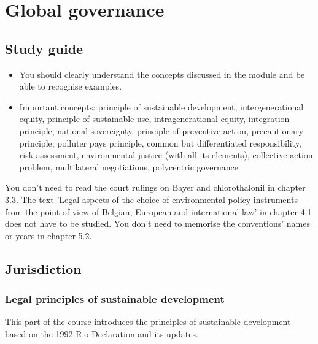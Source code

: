 \documentclass[../summary.tex]{subfiles}
\begin{document}
\section{Global governance}

\subsection{Study guide}
\label{sec:13-study-guide}

\begin{itemize}
	\item You should clearly understand the concepts discussed in the module and be able to recognise examples.
	\item Important concepts: principle of sustainable development, intergenerational equity, principle of sustainable use, intragenerational equity, integration principle, national
	      sovereignty, principle of preventive action, precautionary principle, polluter pays principle, common but differentiated responsibility, risk assessment, environmental justice (with all its elements), collective action problem, multilateral negotiations, polycentric governance
\end{itemize}

You don't need to read the court rulings on Bayer and chlorothalonil in chapter 3.3. The text 'Legal aspects of the choice of environmental policy instruments from the point of view of Belgian, European and international law' in chapter 4.1 does not have to be studied. You don't need to memorise the conventions' names or years in chapter 5.2.

\subsection{Jurisdiction}
\subsubsection{Legal principles of sustainable development}
This part of the course introduces the principles of sustainable development based on the 1992 Rio Declaration and its updates.
\end{document}
